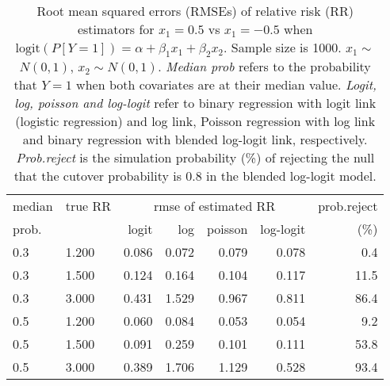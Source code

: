 \documentclass[12pt,a4paper]{article}
\begin{document}
\begin{table}[H] 
\small\sf\centering 
\caption{Root mean squared errors (RMSEs) of relative risk (RR) estimators for $x_1=0.5$ vs $x_1=-0.5$ when $\mbox{logit}(P[Y=1])=\alpha+\beta_1 x_1 + \beta_2 x_2$. Sample size is 1000. $x_1 \sim $$N(0,1)$, $x_2 \sim N(0,1)$. {\it Median prob} refers to the probability that $Y=1$ when both covariates are at their median value. {\it Logit, log, poisson and log-logit} refer to binary regression with logit link (logistic regression) and log link, Poisson regression with log link and binary regression with blended log-logit link, respectively. {\it Prob.reject} is the simulation probability (\%) of rejecting the null that the cutover probability is $0.8$ in the blended log-logit model.} 
\begin{tabular}{llrrrrr} 
\toprule 
median & true RR & \multicolumn{4}{c}{rmse of estimated RR} & prob.reject \\ 
prob. & & logit & log & poisson & log-logit  & (\%) \\ \midrule 
0.3 & 1.200 & 0.086 & 0.072 & 0.079 & 0.078 &  0.4 \\  
0.3 & 1.500 & 0.124 & 0.164 & 0.104 & 0.117 & 11.5 \\  
0.3 & 3.000 & 0.431 & 1.529 & 0.967 & 0.811 & 86.4 \\  
0.5 & 1.200 & 0.060 & 0.084 & 0.053 & 0.054 &  9.2 \\  
0.5 & 1.500 & 0.091 & 0.259 & 0.101 & 0.111 & 53.8 \\  
0.5 & 3.000 & 0.389 & 1.706 & 1.129 & 0.528 & 93.4 \\  
\bottomrule 
\end{tabular} 
\end{table} 
\end{document}
